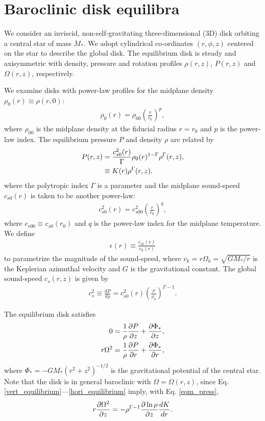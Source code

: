 \section{Baroclinic disk equilibra}
We consider  an inviscid, non-self-gravitating three-dimensional (3D)
disk orbiting a central star of mass $M_*$. 
We adopt cylindrical
co-ordinates $(r,\phi, z)$ centered on the star to describe the global
disk. The equilibrium disk is steady and axisymmetric with density,
pressure and rotation profiles $\rho(r,z)$, $P(r,z)$ and
$\Omega(r,z)$, respectively. 

We examine disks with power-law profiles for the midplane density
$\rho_0(r)\equiv\rho(r,0)$: 
\begin{align}
  \rho_0(r) = \rho_{00}\left(\frac{r}{r_0}\right)^p,
\end{align}
where $\rho_{00}$ is the midplane density at the fiducial radius
$r=r_0$ and $p$ is the power-law index. The equilibrium pressure $P$
and density $\rho$ are related by 
\begin{align}
  P(r,z) &= 
  \frac{c_{s0}^2(r)}{\Gamma}\rho_0(r)^{1-\Gamma}\rho^\Gamma(r,z),\notag\\
  & \equiv K(r)\rho^{\Gamma}(r,z). \label{eqm_press}
\end{align}
where the polytropic index $\Gamma$ is a parameter and 
the midplane sound-speed $c_{s0}(r)$ is taken to be another power-law: 
\begin{align}
  c_{s0}^2(r)=c_{s00}^2\left(\frac{r}{r_0}\right)^q, 
\end{align}
where $c_{s00}\equiv c_{s0}(r_0)$  and $q$ is the power-law index for
the midplane temperature. We define
\begin{align}
  \epsilon(r) \equiv \frac{c_{s0}(r)}{v_k(r)}
\end{align}
to parametrize the magnitude of the sound-speed, where
$v_k=r\Omega_k=\sqrt{GM_*/r}$ is the Keplerian azimuthal velocity and
$G$ is the gravitational constant. 
The global sound-speed $c_s(r,z)$ is given by
\begin{align}
  c_s^2\equiv \frac{dP}{d\rho} =
  c_{s0}^2(r)\left(\frac{\rho}{\rho_0}\right)^{\Gamma-1}. 
\end{align}

The equilibrium disk satisfies
\begin{align}
  0 &= \frac{1}{\rho}\frac{\partial P}{\partial z} + \frac{\partial \Phi_*}{\partial z},\label{vert_equilibrium}\\
  r\Omega^2&= \frac{1}{\rho}\frac{\partial P}{\partial r} + \frac{\partial \Phi_*}{\partial
    r},\label{hori_equilibrium} 
\end{align} 
where $\Phi_* = -GM_*(r^2 + z^2)^{-1/2}$ is the gravitational
potential of the central star. Note that the disk is in general
baroclinic with $\Omega = \Omega(r,z)$, since
Eq. \ref{vert_equilibrium}---\ref{hori_equilibrium} imply, with
Eq. \ref{eqm_press},  
\begin{align}
  r\frac{\partial\Omega^2}{\partial z} = - \rho^{\Gamma-1}\frac{\partial\ln\rho}{\partial z}\frac{dK}{dr}.
\end{align}


